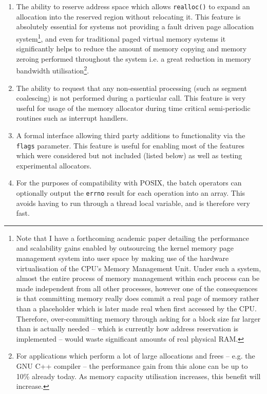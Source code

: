 \documentclass[wd]{isov2}
\begin{document}
{\begin{introduction}
\begin{enumerate}
\item The ability to reserve address space which allows \texttt{realloc()} to expand an allocation into the reserved region without relocating it. This feature is absolutely essential for systems not providing a fault driven page allocation system\footnote{Note that I have a forthcoming academic paper detailing the performance and scalability gains enabled by outsourcing the kernel memory page management system into user space by making use of the hardware virtualisation of the CPU's Memory Management Unit. Under such a system, almost the entire process of memory management within each process can be made independent from all other processes, however one of the consequences is that committing memory really does commit a real page of memory rather than a placeholder which is later made real when first accessed by the CPU. Therefore, over-committing memory through asking for a block size far larger than is actually needed -- which is currently how address reservation is implemented -- would waste significant amounts of real physical RAM.}, and even for traditional paged virtual memory systems it significantly helps to reduce the amount of memory copying and memory zeroing performed throughout the system i.e. a great reduction in memory bandwidth utilisation\footnote{For applications which perform a lot of large allocations and frees -- e.g. the GNU C++ compiler -- the performance gain from this alone can be up to 10\% already today. As memory capacity utilisation increases, this benefit will increase.}.
\item The ability to request that any non-essential processing (such as segment coalescing) is not performed during a particular call. This feature is very useful for usage of the memory allocator during time critical semi-periodic routines such as interrupt handlers.
\item A formal interface allowing third party additions to functionality via the \texttt{flags} parameter. This feature is useful for enabling most of the features which were considered but not included (listed below) as well as testing experimental allocators.
\item For the purposes of compatibility with POSIX, the batch operators can optionally output the \texttt{errno} result for each operation into an array. This avoids having to run through a thread local variable, and is therefore very fast.
\end{enumerate}


\end{introduction}}
\end{document}
